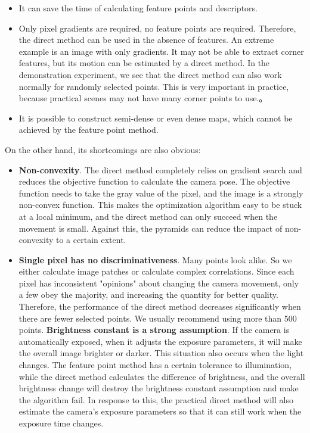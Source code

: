 {\begin{itemize}
	\item It can save the time of calculating feature points and descriptors.
	\item Only pixel gradients are required, no feature points are required. Therefore, the direct method can be used in the absence of features. An extreme example is an image with only gradients. It may not be able to extract corner features, but its motion can be estimated by a direct method. In the demonstration experiment, we see that the direct method can also work normally for randomly selected points. This is very important in practice, because practical scenes may not have many corner points to use.。
	\item It is possible to construct semi-dense or even dense maps, which cannot be achieved by the feature point method.
\end{itemize}

On the other hand, its shortcomings are also obvious:
\begin{itemize}
	\item \textbf{Non-convexity}. The direct method completely relies on gradient search and reduces the objective function to calculate the camera pose. The objective function needs to take the gray value of the pixel, and the image is a strongly non-convex function. This makes the optimization algorithm easy to be stuck at a local minimum, and the direct method can only succeed when the movement is small. Against this, the pyramids can reduce the impact of non-convexity to a certain extent.
	\item \textbf{Single pixel has no discriminativeness}. Many points look alike. So we either calculate image patches or calculate complex correlations. Since each pixel has inconsistent "opinions" about changing the camera movement, only a few obey the majority, and increasing the quantity for better quality. Therefore, the performance of the direct method decreases significantly when there are fewer selected points. We usually recommend using more than 500 points.
	\textbf{Brightness constant is a strong assumption}. If the camera is automatically exposed, when it adjusts the exposure parameters, it will make the overall image brighter or darker. This situation also occurs when the light changes. The feature point method has a certain tolerance to illumination, while the direct method calculates the difference of brightness, and the overall brightness change will destroy the brightness constant assumption and make the algorithm fail. In response to this, the practical direct method will also estimate the camera's exposure parameters \cite{Engel2016} so that it can still work when the exposure time changes.
\end{itemize}

}
